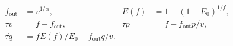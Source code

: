 \documentclass{article}
\begin{document}
\fontsize{22}{29}\selectfont
\[
\begin{aligned} f_{\mathrm{out}}&=v^{1/\alpha},& E(f)&=1-(1-E_0)^{1/f},\\ \tau\dot v&=f-f_{\mathrm{out}},&\tau\dot p&=f-f_{\mathrm{out}}p/v,\\ \tau\dot q&=fE(f)/E_0-f_{\mathrm{out}}q/v.\end{aligned}
\]
\end{document}
